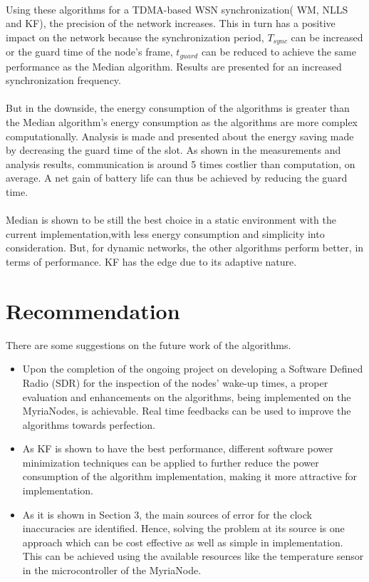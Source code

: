 \documentclass[a4paper,10pt]{report}
\begin{document}
\paragraph*{}
Using these algorithms for a TDMA-based WSN synchronization( WM, NLLS and KF), the precision of the network increases. This in turn has a positive impact on the network because the synchronization period, $T_{sync}$ can be increased or the guard time of the node's frame, $t_{guard}$ can be reduced to achieve the same performance as the Median algorithm. Results are presented for an increased synchronization frequency.
\paragraph*{}
But in the downside, the energy consumption of the algorithms is greater than the Median algorithm's energy consumption as the algorithms are more complex computationally. Analysis is made and presented about the energy saving made by decreasing the guard time of the slot. As shown in the measurements and analysis results, communication is around 5 times costlier than computation, on average. A net gain of battery life can thus be achieved by reducing the guard time.
\paragraph*{}
Median is shown to be still the best choice in a static environment with the current implementation,with less energy consumption and simplicity into consideration. But, for dynamic networks, the other algorithms perform better, in terms of performance. KF has the edge due to its adaptive nature.
\section{\textbf{Recommendation}}
There are some suggestions on the future work of the algorithms.
\begin{itemize}
 \item
Upon the completion of the ongoing project on developing a Software Defined Radio (SDR) for the inspection of the nodes' wake-up times,
a proper evaluation and enhancements on the algorithms, being implemented on the MyriaNodes, is achievable. Real time feedbacks
can be used to improve the algorithms towards perfection.
\item
As KF is shown to have the best performance, different software power minimization techniques can be applied to further reduce the
power consumption of the algorithm implementation, making it more attractive for implementation. \item As it is shown in Section 3, the main sources of error for the clock inaccuracies are identified. Hence, solving the problem at its source is one approach which can be cost
effective as well as simple in implementation. This can be achieved using the available resources like the temperature sensor in the
microcontroller of the MyriaNode.
\end{itemize}
\appendix
\end{document}
